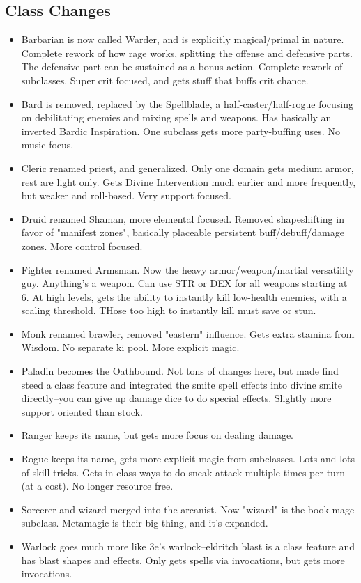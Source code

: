 \subsection*{Class Changes}
\begin{itemize}
    \item Barbarian is now called Warder, and is explicitly magical/primal in nature. Complete rework of how rage works, splitting the offense and defensive parts. The defensive part can be sustained as a bonus action. Complete rework of subclasses. Super crit focused, and gets stuff that buffs crit chance.
    \item Bard is removed, replaced by the Spellblade, a half-caster/half-rogue focusing on debilitating enemies and mixing spells and weapons. Has basically an inverted Bardic Inspiration. One subclass gets more party-buffing uses. No music focus.
    \item Cleric renamed priest, and generalized. Only one domain gets medium armor, rest are light only. Gets Divine Intervention much earlier and more frequently, but weaker and roll-based. Very support focused.
    \item Druid renamed Shaman, more elemental focused. Removed shapeshifting in favor of "manifest zones", basically placeable persistent buff/debuff/damage zones. More control focused.
    \item Fighter renamed Armsman. Now the heavy armor/weapon/martial versatility guy. Anything's a weapon. Can use STR or DEX for all weapons starting at 6. At high levels, gets the ability to instantly kill low-health enemies, with a scaling threshold. THose too high to instantly kill must save or stun.
    \item Monk renamed brawler, removed "eastern" influence. Gets extra stamina from Wisdom. No separate ki pool. More explicit magic.
    \item Paladin becomes the Oathbound. Not tons of changes here, but made find steed a class feature and integrated the smite spell effects into divine smite directly--you can give up damage dice to do special effects. Slightly more support oriented than stock.
    \item Ranger keeps its name, but gets more focus on dealing damage.
    \item Rogue keeps its name, gets more explicit magic from subclasses. Lots and lots of skill tricks. Gets in-class ways to do sneak attack multiple times per turn (at a cost). No longer resource free.
    \item Sorcerer and wizard merged into the arcanist. Now "wizard" is the book mage subclass. Metamagic is their big thing, and it's expanded.
    \item Warlock goes much more like 3e's warlock--eldritch blast is a class feature and has blast shapes and effects. Only gets spells via invocations, but gets more invocations.
\end{itemize}
